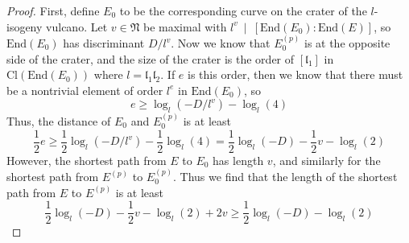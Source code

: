 \documentclass{scrartcl}
\newcommand{\N}{\mathbb{N}}
\newcommand{\End}{\mathrm{End}}
\newcommand{\divides}{\ \mid \ }
\newcommand{\Cl}{\mathrm{Cl}}
\renewcommand{\l}{\mathfrak{l}}
\renewcommand{\N}{\mathfrak{N}}
\theoremstyle{definition}
\begin{document}
\begin{proof}
    First, define $E_0$ to be the corresponding curve on the crater of the $l$-isogeny vulcano.
    Let $v \in \N$ be maximal with $l^v \divides [\End(E_0) : \End(E)]$, so $\End(E_0)$ has discriminant $D/l^v$.
    Now we know that $E_0^{(p)}$ is at the opposite side of the crater, and the size of the crater is the order of $[\l_1]$ in $\Cl(\End(E_0))$ where $l = \l_1\l_2$.
    If $e$ is this order, then we know that there must be a nontrivial element of order $l^e$ in $\End(E_0)$, so
    \begin{equation*}
        e \geq \log_l(-D/l^v) - \log_l(4)
    \end{equation*}
    Thus, the distance of $E_0$ and $E_0^{(p)}$ is at least
    \begin{equation*}
        \frac 1 2 e \geq \frac 1 2 \log_l(-D/l^v) - \frac 1 2 \log_l(4) = \frac 1 2 \log_l(-D) - \frac 1 2 v - \log_l(2)
    \end{equation*}
    However, the shortest path from $E$ to $E_0$ has length $v$, and similarly for the shortest path from $E^{(p)}$ to $E_0^{(p)}$.
    Thus we find that the length of the shortest path from $E$ to $E^{(p)}$ is at least
    \begin{equation*}
        \frac 1 2 \log_l(-D) - \frac 1 2 v - \log_l(2) + 2v \geq \frac 1 2 \log_l(-D) - \log_l(2)
    \end{equation*}
\end{proof}
\end{document}
